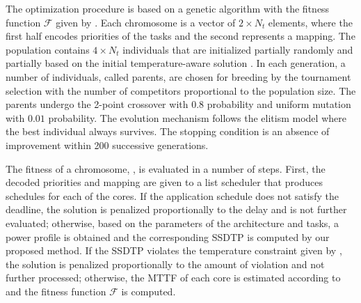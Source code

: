 The optimization procedure is based on a genetic algorithm \cite{schmitz2004}
with the fitness function $\mathcal{F}$ given by . Each
chromosome is a vector of $2 \times N_t$ elements, where the first half encodes
priorities of the tasks and the second represents a mapping. The population
contains $4 \times N_t$ individuals that are initialized partially randomly and
partially based on the initial temperature-aware solution \cite{xie2006}. In
each generation, a number of individuals, called parents, are chosen for
breeding by the tournament selection with the number of competitors proportional
to the population size. The parents undergo the 2-point crossover with $0.8$
probability and uniform mutation with $0.01$ probability. The evolution
mechanism follows the elitism model where the best individual always survives.
The stopping condition is an absence of improvement within 200 successive
generations.

The fitness of a chromosome, , is evaluated in a number
of steps. First, the decoded priorities and mapping are given to a list
scheduler that produces schedules for each of the cores. If the application
schedule does not satisfy the deadline, the solution is penalized proportionally
to the delay and is not further evaluated; otherwise, based on the parameters of
the architecture and tasks, a power profile is obtained and the corresponding
SSDTP is computed by our proposed method. If the SSDTP violates the temperature
constraint given by , the solution is penalized proportionally to
the amount of violation and not further processed; otherwise, the MTTF of each
core is estimated according to  and the fitness function
$\mathcal{F}$ is computed.
